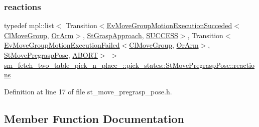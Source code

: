 \subsubsection{\texorpdfstring{reactions}{reactions}}
{\footnotesize\ttfamily typedef mpl\+::list$<$ Transition$<$\hyperlink{structcl__move__group__interface_1_1EvMoveGroupMotionExecutionSucceded}{Ev\+Move\+Group\+Motion\+Execution\+Succeded}$<$\hyperlink{classcl__move__group__interface_1_1ClMoveGroup}{Cl\+Move\+Group}, \hyperlink{classsm__fetch__two__table__pick__n__place__1_1_1OrArm}{Or\+Arm}$>$, \hyperlink{structsm__fetch__two__table__pick__n__place__1_1_1pick__states_1_1StGraspApproach}{St\+Grasp\+Approach}, \hyperlink{classSUCCESS}{S\+U\+C\+C\+E\+SS}$>$, Transition$<$\hyperlink{structcl__move__group__interface_1_1EvMoveGroupMotionExecutionFailed}{Ev\+Move\+Group\+Motion\+Execution\+Failed}$<$\hyperlink{classcl__move__group__interface_1_1ClMoveGroup}{Cl\+Move\+Group}, \hyperlink{classsm__fetch__two__table__pick__n__place__1_1_1OrArm}{Or\+Arm}$>$, \hyperlink{structsm__fetch__two__table__pick__n__place__1_1_1pick__states_1_1StMovePregraspPose}{St\+Move\+Pregrasp\+Pose}, \hyperlink{classABORT}{A\+B\+O\+RT}$>$ $>$ \hyperlink{structsm__fetch__two__table__pick__n__place__1_1_1pick__states_1_1StMovePregraspPose_ad3f8e68560da077ae5d5eb9a2f8a38be}{sm\+\_\+fetch\+\_\+two\+\_\+table\+\_\+pick\+\_\+n\+\_\+place\+\_\+::pick\+\_\+states\+::\+St\+Move\+Pregrasp\+Pose\+::reactions}}



Definition at line 17 of file st\+\_\+move\+\_\+pregrasp\+\_\+pose.\+h.



\subsection{Member Function Documentation}
\mbox{\label{structsm__fetch__two__table__pick__n__place__1_1_1pick__states_1_1StMovePregraspPose_a832273127f1dfc2ccd0ab845ce00d6c4}} 
